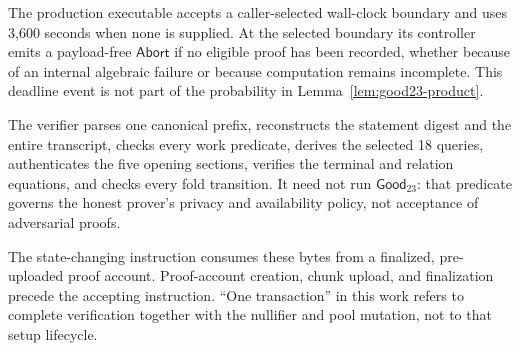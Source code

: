 The production executable accepts a caller-selected wall-clock boundary and
uses 3,600 seconds when none is supplied.  At the selected boundary its
controller emits a payload-free \(\mathsf{Abort}\) if no eligible proof has
been recorded, whether because of an internal algebraic failure or because
computation remains incomplete.  This deadline event is not part of the
probability in Lemma~\ref{lem:good23-product}.

The verifier parses one canonical prefix, reconstructs the statement digest
and the entire transcript, checks every work predicate, derives the selected
18 queries, authenticates the five opening sections, verifies the terminal
and relation equations, and checks every fold transition.  It need not run
\(\mathsf{Good}_{23}\): that predicate governs the honest prover's privacy
and availability policy, not acceptance of adversarial proofs.

The state-changing instruction consumes these bytes from a finalized,
pre-uploaded proof account.  Proof-account creation, chunk upload, and
finalization precede the accepting instruction.  ``One transaction'' in this
work refers to complete verification together with the nullifier and pool
mutation, not to that setup lifecycle.
